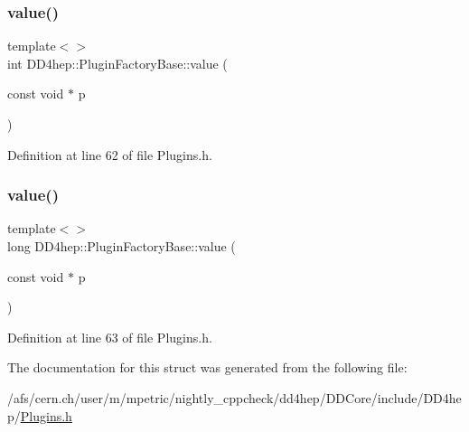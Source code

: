 \subsubsection{\texorpdfstring{value()}{value()}\hspace{0.1cm}{\footnotesize\ttfamily [3/4]}}
{\footnotesize\ttfamily template$<$$>$ \\
int D\+D4hep\+::\+Plugin\+Factory\+Base\+::value (\begin{DoxyParamCaption}\item[{const void $\ast$}]{p }\end{DoxyParamCaption})\hspace{0.3cm}{\ttfamily [inline]}}



Definition at line 62 of file Plugins.\+h.

\hypertarget{struct_d_d4hep_1_1_plugin_factory_base_a5a57b4f1d4424f04dc565923fe43af3e}{}\label{struct_d_d4hep_1_1_plugin_factory_base_a5a57b4f1d4424f04dc565923fe43af3e} 
\subsubsection{\texorpdfstring{value()}{value()}\hspace{0.1cm}{\footnotesize\ttfamily [4/4]}}
{\footnotesize\ttfamily template$<$$>$ \\
long D\+D4hep\+::\+Plugin\+Factory\+Base\+::value (\begin{DoxyParamCaption}\item[{const void $\ast$}]{p }\end{DoxyParamCaption})\hspace{0.3cm}{\ttfamily [inline]}}



Definition at line 63 of file Plugins.\+h.



The documentation for this struct was generated from the following file\+:\begin{DoxyCompactItemize}
\item 
/afs/cern.\+ch/user/m/mpetric/nightly\+\_\+cppcheck/dd4hep/\+D\+D\+Core/include/\+D\+D4hep/\hyperlink{_plugins_8h}{Plugins.\+h}\end{DoxyCompactItemize}
